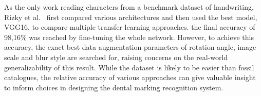 \documentclass[english,twoside,openright]{UH_DS_MSc}
\begin{document}




As the only work reading characters from a benchmark dataset of handwriting, Rizky et al.~\cite{7rizkybasicCnnTransfer}
first compared various architectures and then used the best model, VGG16, to compare multiple transfer learning 
approaches. the final accuracy of 98,16\% was reached by fine-tuning the whole network. However, to achieve this accuracy, the exact best data augmentation parameters of 
rotation angle, image scale and blur style are searched for, raising concerns on the real-world generalizability of this result.
 While the dataset is likely to be easier than fossil catalogues, the relative accuracy of
various approaches can give valuable insight to inform choices in designing the dental marking recognition system.


\end{document}
